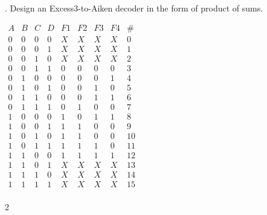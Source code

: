 \documentclass[12pt]{book}
\newenvironment{indented}[1] {
	\begin{list}{}{\setlength{\leftmargin}{#1}}
		\item[]
	}{\end{list}}
\begin{document}
	. Design an Excess3-to-Aiken decoder in the form of product of sums.
	\begin{indented}{5mm}
		$\begin{array}{c|c|c|c||c|c|c|c||c}
			A & B & C & D & F1 & F2 & F3 & F4 & \#\\
			\hline
			0 & 0 & 0 & 0 & X & X & X & X & 0\\
			0 & 0 & 0 & 1 & X & X & X & X & 1\\
			0 & 0 & 1 & 0 & X & X & X & X & 2\\
			0 & 0 & 1 & 1 & 0 & 0 & 0 & 0 & 3\\
			0 & 1 & 0 & 0 & 0 & 0 & 0 & 1 & 4\\
			0 & 1 & 0 & 1 & 0 & 0 & 1 & 0 & 5\\
			0 & 1 & 1 & 0 & 0 & 0 & 1 & 1 & 6\\
			0 & 1 & 1 & 1 & 0 & 1 & 0 & 0 & 7\\
			1 & 0 & 0 & 0 & 1 & 0 & 1 & 1 & 8\\
			1 & 0 & 0 & 1 & 1 & 1 & 0 & 0 & 9\\
			1 & 0 & 1 & 0 & 1 & 1 & 0 & 0 & 10\\
			1 & 0 & 1 & 1 & 1 & 1 & 1 & 0 & 11\\
			1 & 1 & 0 & 0 & 1 & 1 & 1 & 1 & 12\\
			1 & 1 & 0 & 1 & X & X & X & X & 13\\
			1 & 1 & 1 & 0 & X & X & X & X & 14\\
			1 & 1 & 1 & 1 & X & X & X & X & 15\\
		\end{array}$

		\begin{multicols}{2}
			\begin{karnaugh-map}[4][4][1][(F1) \ CD][AB]

			\end{karnaugh-map}\\
			\begin{karnaugh-map}[4][4][1][(F3) \ CD][AB]
	
			\end{karnaugh-map}\\
			\begin{karnaugh-map}[4][4][1][(F2) \ CD][AB]


\end{karnaugh-map}
\end{multicols}
\end{indented}
\end{document}
